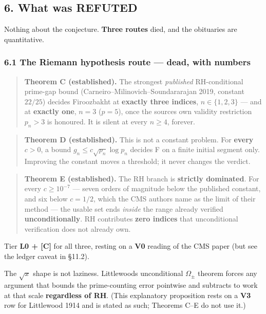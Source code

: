 \documentclass[
  a4paper,
  11pt]{article}
\begin{document}
\subsection{6. What was REFUTED}\label{6-what-was-refuted}

Nothing about the conjecture. \textbf{Three routes} died, and the
obituaries are quantitative.

\subsubsection{6.1 The Riemann hypothesis route --- dead, with
numbers}\label{61-the-riemann-hypothesis-route--dead-with-numbers}

\begin{quote}
\textbf{Theorem C (established).} The strongest \emph{published}
RH-conditional prime-gap bound (Carneiro--Milinovich--Soundararajan
2019, constant \(22/25\)) decides Firoozbakht at \textbf{exactly three
indices}, \(n \in \{1,2,3\}\) --- and at \textbf{exactly one}, \(n = 3\)
(\(p = 5\)), once the source\textquotesingle s own validity restriction
\(p_n > 3\) is honoured. It is silent at every \(n \ge 4\), forever.
\end{quote}

\begin{quote}
\textbf{Theorem D (established).} This is not a constant problem. For
\textbf{every} \(c > 0\), a bound \(g_n \le c\sqrt{p_n}\log p_n\)
decides F on a finite initial segment only. Improving the constant moves
a threshold; it never changes the verdict.
\end{quote}

\begin{quote}
\textbf{Theorem E (established).} The RH branch is \textbf{strictly
dominated}. For every \(c \ge 10^{-7}\) --- seven orders of magnitude
below the published constant, and six below \(c = 1/2\), which the CMS
authors name as the limit of their method --- the usable set ends
\emph{inside} the range already verified \textbf{unconditionally}. RH
contributes \textbf{zero indices} that unconditional verification does
not already own.
\end{quote}

Tier \textbf{L0 + {[}C{]}} for all three, resting on a \textbf{V0}
reading of the CMS paper (but see the ledger caveat in §11.2).

The \(\sqrt{x}\) shape is not laziness. Littlewood\textquotesingle s
unconditional \(\Omega_\pm\) theorem forces any argument that bounds the
prime-counting error pointwise and subtracts to work at that scale
\textbf{regardless of RH}. (This explanatory proposition rests on a
\textbf{V3} row for Littlewood 1914 and is stated as such; Theorems C--E
do not use it.)
\end{document}
